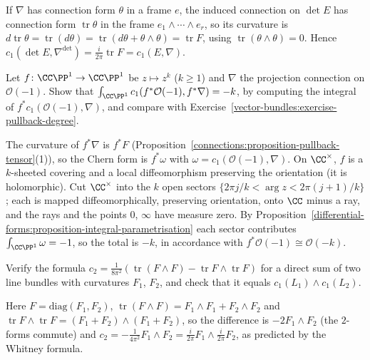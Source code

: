 \begin{solution}
If $\nabla$ has connection form $\theta$ in a frame $e$, the induced connection on $\det E$ has connection form $\operatorname{tr}\theta$ in the frame $e_1 \wedge \cdots \wedge e_r$, so its curvature is
$d\operatorname{tr}\theta = \operatorname{tr}(d\theta) = \operatorname{tr}(d\theta + \theta \wedge \theta) = \operatorname{tr}F$, using $\operatorname{tr}(\theta \wedge \theta) = 0$. Hence
$c_1(\det E, \nabla^{\det}) = \frac{i}{2\pi}\operatorname{tr}F = c_1(E, \nabla)$.
\end{solution}

\begin{exercise}\label{characteristic-classes:exercise-pullback-curvature}
Let $f \colon \CC\PP^1 \to \CC\PP^1$ be $z \mapsto z^k$ ($k \geq 1$) and $\nabla$ the projection connection on $\mathcal{O}(-1)$. Show that $\int_{\CC\PP^1}c_1(f^*\mathcal{O}(-1), f^*\nabla) = -k$,
by computing the integral of $f^*c_1(\mathcal{O}(-1), \nabla)$, and compare with Exercise~\ref{vector-bundles:exercise-pullback-degree}.
\end{exercise}

\begin{solution}
The curvature of $f^*\nabla$ is $f^*F$ (Proposition~\ref{connections:proposition-pullback-tensor}(1)), so the Chern form is $f^*\omega$ with $\omega = c_1(\mathcal{O}(-1), \nabla)$. On
$\CC^\times$, $f$ is a $k$-sheeted covering and a local diffeomorphism preserving the orientation (it is holomorphic). Cut $\CC^\times$ into the $k$ open sectors
$\{2\pi j/k < \arg z < 2\pi(j + 1)/k\}$; each is mapped diffeomorphically, preserving orientation, onto $\CC$ minus a ray, and the rays and the points $0$, $\infty$ have measure zero. By
Proposition~\ref{differential-forms:proposition-integral-parametrisation} each sector contributes $\int_{\CC\PP^1}\omega = -1$, so the total is $-k$, in accordance with
$f^*\mathcal{O}(-1) \cong \mathcal{O}(-k)$.
\end{solution}

\begin{exercise}\label{characteristic-classes:exercise-c2-formula}
Verify the formula $c_2 = \frac{1}{8\pi^2}(\operatorname{tr}(F \wedge F) - \operatorname{tr}F \wedge \operatorname{tr}F)$ for a direct sum of two line bundles with curvatures $F_1$, $F_2$, and check that it
equals $c_1(L_1) \wedge c_1(L_2)$.
\end{exercise}

\begin{solution}
Here $F = \mathrm{diag}(F_1, F_2)$, $\operatorname{tr}(F \wedge F) = F_1 \wedge F_1 + F_2 \wedge F_2$ and $\operatorname{tr}F \wedge \operatorname{tr}F = (F_1 + F_2) \wedge (F_1 + F_2)$, so the difference is
$-2F_1 \wedge F_2$ (the $2$-forms commute) and $c_2 = -\frac{1}{4\pi^2}F_1 \wedge F_2 = \frac{i}{2\pi}F_1 \wedge \frac{i}{2\pi}F_2$, as predicted by the Whitney formula.
\end{solution}


